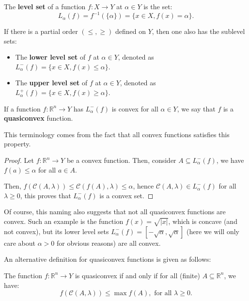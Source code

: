 \begin{definition}
\label{def:Level and Sublevel sets}
  The \textbf{level set} of a function \( f: X \to Y \) at \( \alpha \in Y \) is
  the set:
  \[
    L_{\alpha}(f) = f^{-1}(\{\alpha\}  ) = \{x \in X, f(x) = \alpha\}  
  .\] 

  If there is a partial order \( (\le, \ge ) \) defined on \( Y \), then one
  also has the sublevel sets:
  \begin{itemize}
  \item The \textbf{lower level set} of \( f \) at \( \alpha \in Y \), denoted
    as \( L_{\alpha}^{-}(f) = \{x \in X, f(x) \le \alpha\}   \).
  \item The \textbf{upper level set} of \( f \) at \( \alpha \in Y \), denoted
    as \( L_{\alpha}^{+}(f) = \{x \in X, f(x) \ge \alpha\}   \).
  \end{itemize}
\end{definition}

\begin{theorem}
\label{thr:Convex functions are quasiconvex}
  If a function \( f: \mathbb{R}^{n} \to Y \) has \(
  L_{\alpha}^{-}(f) \) is convex for all \( \alpha \in Y \), we say that \( f \)
  is a \textbf{quasiconvex} function.

  This terminology comes from the fact that all convex functions satisfies this
  property.
\end{theorem}

\begin{proof}
  Let \( f: \mathbb{R}^{n} \to  Y \) be a convex function. Then, consider \( A
  \subseteq L_{\alpha}^{-}(f) \), we have \( f(a) \le \alpha \) for all \( a \in
  A\).

  Then, \( f(\mathcal{C}(A, \lambda)) \le \mathcal{C}(f(A), \lambda) \le \alpha
  \), hence \( \mathcal{C}(A, \lambda) \in L_{\alpha}^{-}(f) \) for all \( \lambda
  \ge 0\), this proves that \( L_{\alpha}^{-}(f) \) is a convex set.
\end{proof}

Of course, this naming also suggests that not all quasiconvex functions are
convex. Such an example is the function \( f(x) = \sqrt{|x|}  \), which is concave
(and not convex), but its lower level sets \( L_{\alpha}^{-}(f) =
[-\sqrt{\alpha}, \sqrt{\alpha} ] \) (here we will only care about \( \alpha > 0
\) for obvious reasons) are all convex.

An alternative definition for quasiconvex functions is given as follows:
\begin{theorem}
\label{thr:Alternative definition for quasiconvex functions}
  The function \( f: \mathbb{R}^{n} \to  Y \) is quasiconvex if and
  only if for all (finite) \( A \subseteq  \mathbb{R}^{n} \), we have:
  \[
    f(\mathcal{C}(A, \lambda)) \le \max f(A), \text{ for all } \lambda \ge  0.
  \] 
\end{theorem}

